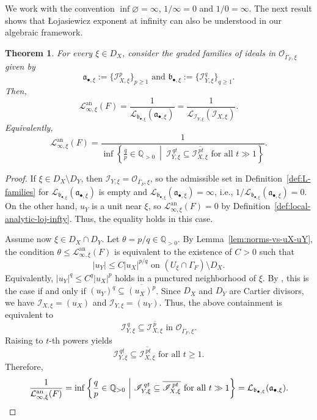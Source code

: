 \documentclass[12pt]{amsart}
\newcommand{\QQ}{\mathbb{Q}}
\renewcommand{\a}{\mathfrak{a}}
\renewcommand{\b}{\mathfrak{b}}
\newcommand{\cO}{\mathcal{O}}
\newcommand{\Loj}{\mathcal{L}} %
\theoremstyle{plain}
\newtheorem{theorem}{Theorem}[section]
\theoremstyle{definition}
\numberwithin{equation}{section}
\begin{document}
We work with the convention $\inf\varnothing=\infty$, $1/\infty=0$ and $1/0=\infty$. The next result shows that \L{}ojasiewicz exponent at infinity can also be understood in our algebraic framework.


\begin{theorem}\label{thm:analytic-algebraic-local-infty}
For every $\xi\in D_X$, consider the graded families of ideals in $\cO_{\overline{\Gamma}_F,\xi}$ given by
\[
\a_{\bullet,\xi}:=\{\mathscr I_{X,\xi}^p\}_{p\ge1}
\text{ and }
\b_{\bullet,\xi}:=\{\mathscr I_{Y,\xi}^q\}_{q\ge1}.
\]
Then,
\[
\Loj^{\text{an}}_{\infty,\xi}(F)=\frac{1}{\Loj_{\b_{\bullet,\xi}}(\a_{\bullet,\xi})} = \frac{1}{\Loj_{\mathscr I_{Y,\xi}}(\mathscr I_{X, \xi})}.
\]
Equivalently,
\[
\Loj^{\text{an}}_{\infty,\xi}(F)
=
\frac{1}{\inf\left\{
\frac{q}{p}\in\QQ_{>0}
\ \middle|\
\mathscr I_{Y,\xi}^{\,qt}\subseteq \overline{\mathscr I_{X,\xi}^{\,pt}}
\text{ for all }t\gg 1
\right\}}.
\]
\end{theorem}

\begin{proof}
If $\xi\in D_X\setminus D_Y$, then $\mathscr I_{Y,\xi}=\cO_{\overline{\Gamma}_F,\xi}$, so the admissible
set in Definition~\ref{def:L-families} for $\Loj_{\b_{\bullet,\xi}}(\a_{\bullet,\xi})$ is empty and $\Loj_{\b_{\bullet,\xi}}(\a_{\bullet,\xi})=\infty$, i.e., $1/\Loj_{\b_{\bullet,\xi}}(\a_{\bullet,\xi}) = 0$.
On the other hand, $u_Y$ is a unit near $\xi$, so
$\Loj^{\text{an}}_{\infty,\xi}(F)=0$ by Definition~\ref{def:local-analytic-loj-infty}.
Thus, the equality holds in this case.

Assume now $\xi\in D_X\cap D_Y$.
Let $\theta=p/q\in\QQ_{>0}$.
By Lemma~\ref{lem:norms-vs-uX-uY}, the condition
$\theta\le \Loj^{\text{an}}_{\infty,\xi}(F)$ is equivalent to the existence of
$C>0$ such that
\[
|u_Y|\le C|u_X|^{p/q}
\text{ on }(U_\xi\cap\Gamma_F)\setminus D_X.
\]
Equivalently, $|u_Y|^q\le C^q|u_X|^p$ holds in a punctured neighborhood of $\xi$.
By \cite[Th\'eor\`em 2.1]{LT}, this is the case if and only if $(u_Y)^q \subseteq \overline{(u_X)^p}$.
Since $D_X$ and $D_Y$ are Cartier divisors, we have
$\mathscr I_{X,\xi}=(u_X)$ and $\mathscr I_{Y,\xi}=(u_Y)$.
Thus, the above containment is equivalent to
\[
\mathscr I_{Y,\xi}^{\,q}\subseteq \overline{\mathscr I_{X,\xi}^{\,p}}
\text{ in }\cO_{\overline{\Gamma}_F,\xi}.
\]
Raising to $t$-th powers yields
\[
\mathscr I_{Y,\xi}^{\,qt}\subseteq \overline{\mathscr I_{X,\xi}^{\,pt}}
\text{ for all }t\ge 1.
\]
Therefore,
\[
\frac{1}{\Loj^{\text{an}}_{\infty,\xi}(F)}
=
\inf\left\{
\frac{q}{p}\in\QQ_{>0}
\ \middle|\
\mathscr I_{Y,\xi}^{\,qt}\subseteq
\overline{\mathscr I_{X,\xi}^{\,pt}}
\text{ for all }t\gg 1
\right\}
=
\Loj_{\b_{\bullet,\xi}}(\a_{\bullet,\xi}). \qedhere
\]
\end{proof}
\end{document}
